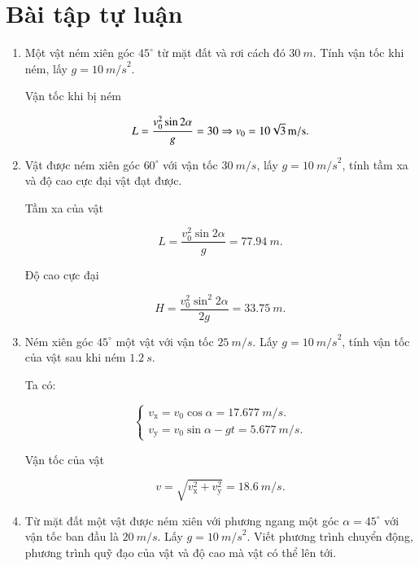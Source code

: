 \section{Bài tập tự luận}
\begin{enumerate}[label=\bfseries Bài \arabic*:,leftmargin=1.5cm]
	\item {}
	
	
	{Một vật ném xiên góc $45^\circ$ từ mặt đất và rơi cách đó $\SI{30}{m}$. Tính vận tốc khi ném, lấy $g=\SI{10}{m/s}^2$.
	}
	
	\hideall
	{	
		
		Vận tốc khi bị ném
		
		$$L = \dfrac{v^2_0 \sin 2\alpha}{g} = 30 \Rightarrow v_0 = \xsi{10\sqrt 3}{m/s}.$$
	}
	
	
	\item {}
	
	
	{Vật được ném xiên góc $60^\circ$ với vận tốc $\SI{30}{m/s}$, lấy $g=\SI{10}{m/s}^2$, tính tầm xa và độ cao cực đại vật đạt được.
	}
	
	\hideall
	{	
		Tầm xa của vật
		
		$$L = \dfrac{v^2_0 \sin 2\alpha}{g} = \SI{77,94}{m}.$$
		
		Độ cao cực đại
		
		$$H = \dfrac{v^2_0\sin^2 2\alpha}{2g} = \SI{33,75}{m}.$$
		
	}
	\item {}
	
	
	
	{Ném xiên góc $45^\circ$ một vật với vận tốc $\SI{25}{m/s}$. Lấy $g=\SI{10}{m/s}^2$, tính vận tốc của vật sau khi ném $\SI{1,2}{s}$.
	}
	
	\hideall
	{	
		Ta có:
		
		$$\begin{cases}
			v_\text{x} = v_0 \cos \alpha = \SI{17,677}{m/s}.\\
			v_\text{y} = v_0 \sin \alpha - gt = \SI{5,677}{m/s}.
		\end{cases}$$
		
		Vận tốc của vật
		
		$$v = \sqrt{v^2_\text{x} + v^2_\text{y}} = \SI{18,6}{m/s}.$$
		
	}
	\item {}
	
	
	
	{Từ mặt đất một vật được ném xiên với phương ngang một góc $\alpha = 45^\circ$ với vận tốc ban đầu là $\SI{20}{m/s}$. Lấy $g=\SI{10}{m/s}^2$. Viết phương trình chuyển động, phương trình quỹ đạo của vật và độ cao mà vật có thể lên tới.
	}
	

\end{enumerate}
